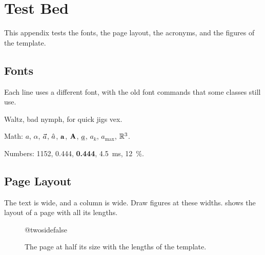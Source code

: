 \section{Test Bed}\label{sec:TestBed}
This appendix tests the fonts, the page layout, the acronyms, and the figures of the template.

\subsection{Fonts}
Each line uses a different font, with the old font commands that some classes still use.

\noindent Waltz, bad nymph, for quick jigs vex.








\noindent Math: $a$, $\alpha$, $\vec{a}$, $\hat{a}$, $\mathbf{a}$, $\mathbf{A}$, $\underline{a}$, $a_k$, $a_\mathrm{max}$, $\mathbb{R}^3$.

\noindent Numbers: \num{1152}, \num{0.444}, \textbf{\num{0.444}}, \qty{4.5}{\milli\second}, \qty{12}{\percent}.

\subsection{Page Layout}
The text is \the\textwidth{} wide, and a column is \the\columnwidth{} wide.
Draw figures at these widths.
 shows the layout of a page with all its lengths.

\begin{figure}[p]
    \centering
    {\csname @twosidefalse\endcsname
     \renewcommand{\newpage}{}%
     \renewcommand{\thispagestyle}[1]{}%
     \layout}
    \vspace{80pt}
    \caption{
        The page at half its size with the lengths of the template.
    }
    \label{fig:TestLayout}
\end{figure}

